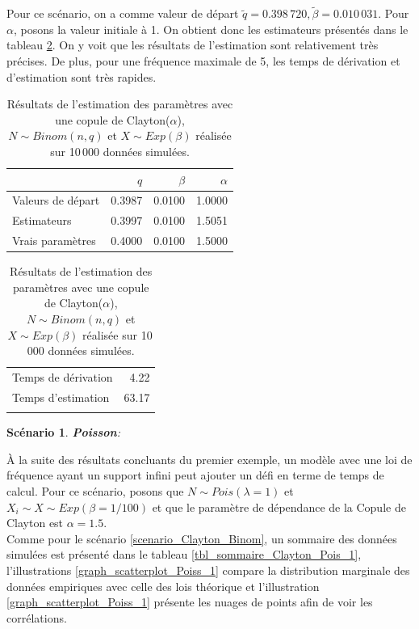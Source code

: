 \documentclass{article}
\newtheorem{Scenario}{Scénario}
\begin{document}
		Pour ce scénario, on a comme valeur de départ $\tilde{q} = 0.398\,720, \tilde{\beta} = 0.010\,031$. Pour $\alpha$, posons la valeur initiale à 1. On obtient donc les estimateurs présentés dans le tableau \ref{tbl_Clayton_Binom}. On y voit que les résultats de l'estimation sont relativement très précises. De plus, pour une fréquence maximale de 5, les temps de dérivation et d'estimation sont très rapides.
		
		\begin{table}[H]
			\centering
			\begin{tabular}{lrrr}
				\hline
				& $q$ & $\beta$ & $\alpha$ \\ 
				\hline
				Valeurs de départ & 0.3987 & 0.0100 & 1.0000 \\ 
				Estimateurs & 0.3997 & 0.0100 & 1.5051 \\ 
				Vrais paramètres & 0.4000 & 0.0100 & 1.5000 \\   
				\hline
			\end{tabular}
			\begin{tabular}{lr}
				\hline
				&  \\ 
				\hline
				Temps de dérivation & 4.22  \\ 
				Temps d'estimation & 63.17  \\  
				\\
				\hline
			\end{tabular}
			\caption[Résultats du scénario \ref{scenario_Clayton_Binom}]{Résultats de l'estimation des paramètres avec une copule de Clayton($\alpha$), $N\sim Binom(n,q)$ et $X \sim Exp(\beta)$ réalisée sur 10\,000 données simulées.} 
			\label{tbl_Clayton_Binom}
		\end{table}
		
		\begin{Scenario}\label{scenario_Clayton_Pois}
			\textbf{Poisson}:
		\end{Scenario}
	
		À la suite des résultats concluants du premier exemple, un modèle avec une loi de fréquence ayant un support infini peut ajouter un défi en terme de temps de calcul. Pour ce scénario, posons que $N \sim Pois(\lambda=1)$ et $X_i \sim X \sim Exp(\beta=1/100)$ et que le paramètre de dépendance de la Copule de Clayton est $\alpha = 1.5$. \\
		
		Comme pour le scénario \ref{scenario_Clayton_Binom}, un sommaire des données simulées est présenté dans le tableau \ref{tbl_sommaire_Clayton_Pois_1}, l'illustrations \ref{graph_scatterplot_Poiss_1} compare la distribution marginale des données empiriques avec celle des lois théorique et l'illustration \ref{graph_scatterplot_Poiss_1} présente les nuages de points afin de voir les corrélations.
		
\end{document}
